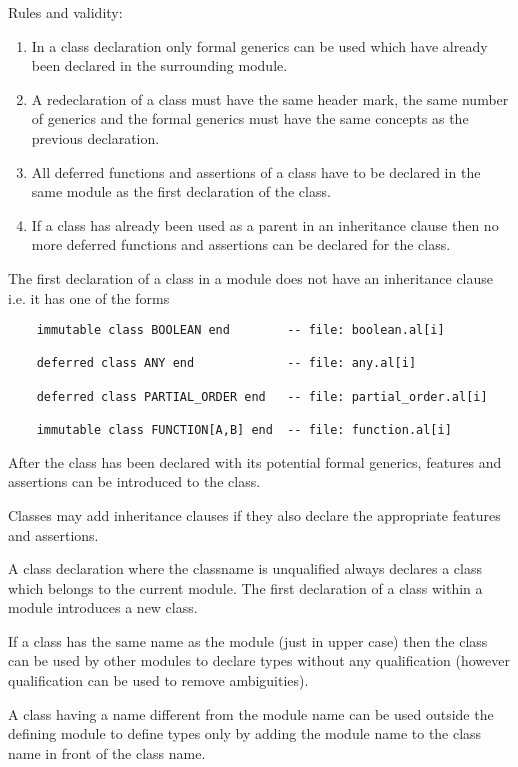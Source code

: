\noindent Rules and validity:
\begin{enumerate}
\item In a class declaration only formal generics can be used which have
  already been declared in the surrounding module.

\item A redeclaration of a class must have the same header mark, the same
  number of generics and the formal generics must have the same concepts as
  the previous declaration.

\item All deferred functions and assertions of a class have to be declared in
  the same module as the first declaration of the class.

\item If a class has already been used as a parent in an inheritance clause
  then no more deferred functions and assertions can be declared for the class.
\end{enumerate}

The first declaration of a class in a module does not have an inheritance
clause i.e. it has one of the forms

\begin{lstlisting}
    immutable class BOOLEAN end        -- file: boolean.al[i]

    deferred class ANY end             -- file: any.al[i]

    deferred class PARTIAL_ORDER end   -- file: partial_order.al[i]

    immutable class FUNCTION[A,B] end  -- file: function.al[i]
\end{lstlisting}
After the class has been declared with its potential formal generics, features
and assertions can be introduced to the class.

Classes may add inheritance clauses if they also declare the appropriate
features and assertions.

A class declaration where the classname is unqualified always declares a class
which belongs to the current module. The first declaration of a class within a
module introduces a new class.

If a class has the same name as the module (just in upper case) then the class
can be used by other modules to declare types without any qualification
(however qualification can be used to remove ambiguities).

A class having a name different from the module name can be used outside the
defining module to define types only by adding the module name to the class
name in front of the class name.

